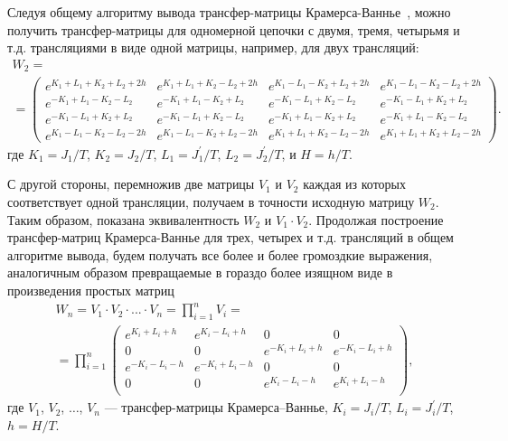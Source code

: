 Следуя общему алгоритму вывода трансфер-матрицы Крамерса-Ваннье~\cite{kramers_wannier1}, можно получить трансфер-матрицы для одномерной цепочки с двумя, тремя, четырьмя и т.д. трансляциями в виде одной матрицы, например, для двух трансляций:
\begin{multline}
W_2=\\=
\begin{pmatrix}
e^{K_{1}+L_{1}+K_{2}+L_{2}+2h}\!\! &\! e^{K_{1}+L_{1}+K_{2}-L_{2}+2h}&\!\! e^{K_{1}-L_{1}-K_{2}+L_{2}+2h}\!\! &\! e^{K_{1}-L_{1}-K_{2}-L_{2}+2h}\\
e^{-K_{1}+L_{1}-K_{2}-L_{2}}\!\! &\! e^{-K_{1}+L_{1}-K_{2}+L_{2}}& \!\! e^{-K_{1}-L_{1}+K_{2}-L_{2}}\!\! &\! e^{-K_{1}-L_{1}+K_{2}+L_{2}}\\
e^{-K_{1}-L_{1}+K_{2}+L_{2}}\!\! &\!  e^{-K_{1}-L_{1}+K_{2}-L_{2}}&\!\! e^{-K_{1}+L_{1}-K_{2}+L_{2}}\!\!  &\!  e^{-K_{1}+L_{1}-K_{2}-L_{2}}\\
e^{K_{1}-L_{1}-K_{2}-L_{2}-2h}\!\! & \!  e^{K_{1}-L_{1}-K_{2}+L_{2}-2h}&\!\! e^{K_{1}+L_{1}+K_{2}-L_{2}-2h}\!\!  &\!   e^{K_{1}+L_{1}+K_{2}+L_{2}-2h}
\label{11}
\end{pmatrix}.
\end{multline}
где $K_1=J_1/T$, $K_2=J_2/T$, $L_1=J^{'}_1/T$, $L_2=J^{'}_2/T$, и $H=h/T$.

С другой стороны, перемножив две матрицы $V_1$ и $V_2$ каждая из которых соответствует одной трансляции, получаем в точности исходную матрицу $W_2$. Таким образом, показана эквивалентность $W_2$ и $V_1\cdot V_2$. Продолжая построение трансфер-матриц Крамерса-Ваннье для трех, четырех и т.д. трансляций в общем алгоритме вывода, будем получать все более и более громоздкие выражения, аналогичным образом превращаемые в гораздо более изящном виде в произведения простых матриц
\begin{multline}
W_n = V_1\cdot V_2 \cdot... \cdot V_n = \prod_{i=1}^n V_i =\\= \prod_{i=1}^n  \begin{pmatrix}
e^{K_{i}+L_{i}+h}\!\! &\! e^{K_{i}-L_{i}+h}&\!\! 0\!\! &\! 0\\
0\!\! &\! 0& \!\! e^{-K_{i}+L_{i}+h}\!\! &\! e^{-K_{i}-L_{i}+h}\\
e^{-K_{i}-L_{i}-h}\!\! &\!  e^{-K_{i}+L_{i}-h}&\!\! 0\!\!  &\!  0\\
0\!\! & \!  0&\!\! e^{K_{i}-L_{i}-h}\!\!  &\!   e^{K_{i}+L_{i}-h}\\
\end{pmatrix},
\label{2}
\end{multline}
где $V_1$, $V_2$, $\dots$, $V_n$ --- трансфер-матрицы Крамерса--Ваннье, \mbox{$K_i = J_i/T$}, \mbox{$L_i = J_i^{'}/T$}, $h=H/T$.

